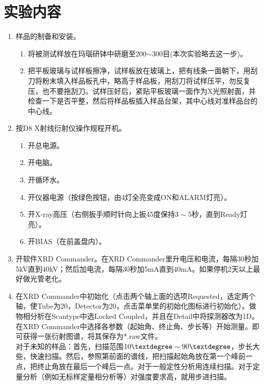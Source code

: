 \documentclass[a4paper]{article}
\begin{document}
\section{实验内容}
\begin{enumerate}
\item 样品的制备和安装。
\begin{enumerate}
\item 将被测试样放在玛瑙研钵中研磨至200$\sim$300目(本次实验略去这一步)。
\item 把平板玻璃与试样板擦净，试样板放在玻璃上，把有线条一面朝下，用刮刀将粉末填入样品板孔中，略高于样品板，用刮刀将试样压平，勿反复压，也不要拖刮刀。试样压好后，紧贴平板玻璃一面作为X光照射面，并检查一下是否平整，然后将样品板插入样品台架，其中心线对准样品台的中心线。
\end{enumerate}
\item 按D8 X射线衍射仪操作规程开机。
\begin{enumerate}
	\item 开总电源。
    \item 开电脑。
	\item 开循环水。
	\item 开仪器电源（按绿色按钮，由4灯全亮变成ON和ALARM灯亮）。
	\item 开X-ray高压（右侧扳手顺时针向上扳45度保持$ 3\sim 5 $秒，直到Ready灯亮）。
	\item 开BIAS（在前盖盘内）。
\end{enumerate}
\item 开软件XRD Commander。在XRD Commander里升电压和电流，每隔30秒加5kV直到40kV；然后加电流，每隔30秒加5mA直到40mA。如果停机2天以上最好做光管老化。
\item 在XRD Commander中初始化（点击两个轴上面的选项Requested，选定两个轴，使Tube为20，Detector为20，点击菜单里的初始化图标进行初始化）。做物相分析在Scantype中选Locked Coupled，并且在Detail中将探测器改为1D。
在XRD Commander中选择各参数（起始角、终止角、步长等）开始测量。即可获得一张衍射图谱，将其保存为*.raw文件。\\
对于未知的样品：首先，扫描范围$ 10\textdegree\sim 90\textdegree $，步长大些，快速扫描。然后，参照第前面的谱线，把扫描起始角放在第一个峰前一点，把终止角放在最后一个峰后一点。对于一般定性分析用连续扫描。对于定量分析（例如无标样定量相分析等）对强度要求高，就用步进扫描。

\end{enumerate}
\end{document}
